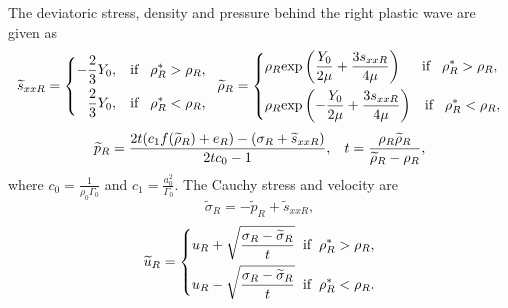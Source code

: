 \documentclass{article}
\numberwithin{equation}{section}
\numberwithin{table}{section}
\begin{document}
The deviatoric stress, density and pressure behind the right plastic wave are given as
\begin{equation}
  \widetilde{s}_{xxR} =\left\{ \begin{aligned}
	  -\frac{2}{3}Y_0, \hspace{0.3cm} \text{if} \hspace{0.3cm} \rho_R^* > \rho_R,\\
	  \frac{2}{3}Y_0, \hspace{0.3cm} \text{if} \hspace{0.3cm} \rho_R^* < \rho_R,\\
	\end{aligned}\right.
	\hspace{0.2cm} \widetilde{\rho}_{R} = \left\{ \begin{aligned}
	  & \rho_R \text{exp}\left(\frac{Y_0}{2\mu}+\frac{3 s_{xxR}}{4\mu}\right)  \hspace{0.5cm} \text{if} \hspace{0.3cm} \rho_R^* > \rho_R,\\
& \rho_R \text{exp}\left(-\frac{Y_0}{2\mu}+\frac{3 s_{xxR}}{4\mu}\right)
\hspace{0.3cm} \text{if} \hspace{0.3cm} \rho_R^* < \rho_R,\\
  \end{aligned}\right.
 \end{equation}
\begin{equation}
  \widetilde{p}_R= \frac{2t(c_1f(\widetilde{\rho}_R)+e_R)-(\sigma_R+\widetilde{s}_{xxR})}{2tc_0-1}, \hspace{0.3cm}
t=\frac{\rho_R \widetilde{\rho}_R}{\widetilde{\rho}_R-\rho_R},
\end{equation}
where $c_0 =\frac{1}{\rho_0 \Gamma_0}$ and $c_1 = \frac{a_0^2}{\Gamma_0}$.
The Cauchy stress and velocity are
\begin{equation}
\widetilde{\sigma}_R = -\widetilde{p}_R+\widetilde{s}_{xxR},
\end{equation}
\begin{equation}
  \widetilde{u}_R= \left\{
  \begin{aligned}
	u_R+\sqrt{\frac{\sigma_R-\widetilde{\sigma}_R}{t}} \hspace{0.2cm} \text{if} \hspace{0.2cm} \rho_R^* >\rho_R,\\
	u_R-\sqrt{\frac{\sigma_R-\widetilde{\sigma}_R}{t}} \hspace{0.2cm} \text{if} \hspace{0.2cm} \rho_R^* <\rho_R.\\
\end{aligned} \right.
\end{equation}
\end{document}
